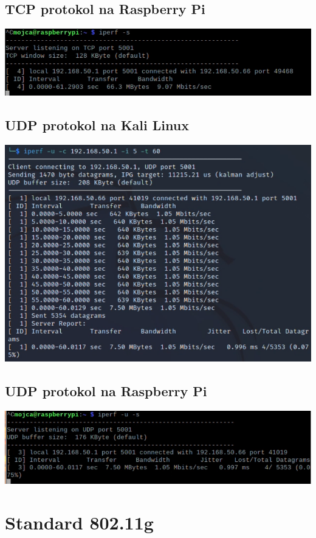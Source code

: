 \documentclass[11pt,a4paper,slovene]{article}
\begin{document}
\subsection{TCP protokol na Raspberry Pi}
\includegraphics[width=\textwidth]{2_dn_tcp_b_rpi}

\subsection{UDP protokol na Kali Linux}
\includegraphics[width=\textwidth]{2_dn_udp_b_kali}

\subsection{UDP protokol na Raspberry Pi}
\includegraphics[width=\textwidth]{2_dn_udp_b_rpi}

\section{Standard 802.11g}
\end{document}
